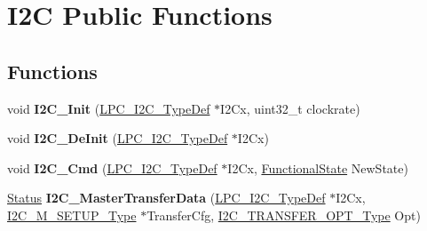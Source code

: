 \hypertarget{group___i2_c___public___functions}{\section{\-I2\-C \-Public \-Functions}
\label{group___i2_c___public___functions}
}
\subsection*{\-Functions}
\begin{DoxyCompactItemize}
\item 
\hypertarget{group___i2_c___public___functions_ga4f0c228696f1a8b60437241ba9af7455}{void {\bfseries \-I2\-C\-\_\-\-Init} (\hyperlink{struct_l_p_c___i2_c___type_def}{\-L\-P\-C\-\_\-\-I2\-C\-\_\-\-Type\-Def} $\ast$\-I2\-Cx, uint32\-\_\-t clockrate)}\label{group___i2_c___public___functions_ga4f0c228696f1a8b60437241ba9af7455}

\item 
\hypertarget{group___i2_c___public___functions_ga761d88cee2fa33f03e1c08c44057fc5b}{void {\bfseries \-I2\-C\-\_\-\-De\-Init} (\hyperlink{struct_l_p_c___i2_c___type_def}{\-L\-P\-C\-\_\-\-I2\-C\-\_\-\-Type\-Def} $\ast$\-I2\-Cx)}\label{group___i2_c___public___functions_ga761d88cee2fa33f03e1c08c44057fc5b}

\item 
\hypertarget{group___i2_c___public___functions_gae592e1754a5500b03a1bb92d30e04246}{void {\bfseries \-I2\-C\-\_\-\-Cmd} (\hyperlink{struct_l_p_c___i2_c___type_def}{\-L\-P\-C\-\_\-\-I2\-C\-\_\-\-Type\-Def} $\ast$\-I2\-Cx, \hyperlink{group___l_p_c___types___public___types_gac9a7e9a35d2513ec15c3b537aaa4fba1}{\-Functional\-State} \-New\-State)}\label{group___i2_c___public___functions_gae592e1754a5500b03a1bb92d30e04246}

\item 
\hypertarget{group___i2_c___public___functions_ga102947f62951ca9031674c3df8117352}{\hyperlink{group___l_p_c___types___public___types_ga67a0db04d321a74b7e7fcfd3f1a3f70b}{\-Status} {\bfseries \-I2\-C\-\_\-\-Master\-Transfer\-Data} (\hyperlink{struct_l_p_c___i2_c___type_def}{\-L\-P\-C\-\_\-\-I2\-C\-\_\-\-Type\-Def} $\ast$\-I2\-Cx, \hyperlink{struct_i2_c___m___s_e_t_u_p___type}{\-I2\-C\-\_\-\-M\-\_\-\-S\-E\-T\-U\-P\-\_\-\-Type} $\ast$\-Transfer\-Cfg, \hyperlink{group___i2_c___public___types_gacbdb9912dc18d79d425d9ac7e1333095}{\-I2\-C\-\_\-\-T\-R\-A\-N\-S\-F\-E\-R\-\_\-\-O\-P\-T\-\_\-\-Type} \-Opt)}\label{group___i2_c___public___functions_ga102947f62951ca9031674c3df8117352}


\end{DoxyCompactItemize}
